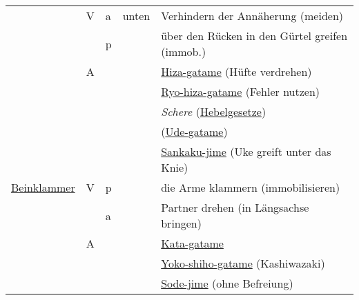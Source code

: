 \documentclass[justified, a4paper, notitlepage, captions=tableheading, nobib]{tufte-handout}
\begin{document}
\begin{center}
\begin{tabular}{lllll}
 & V & a & unten & Verhindern der Annäherung (meiden)\\
 &  & p &  & über den Rücken in den Gürtel greifen (immob.)\\
 & A &  &  & \hyperref[org937174c]{Hiza-gatame} (Hüfte verdrehen)\\
 &  &  &  & \hyperref[org5a19c66]{Ryo-hiza-gatame} (Fehler nutzen)\\
 &  &  &  & \emph{Schere} (\hyperref[org6c6f271]{Hebelgesetze})\\
 &  &  &  & (\hyperref[org7d0d631]{Ude-gatame})\\
 &  &  &  & \hyperref[orgb11245f]{Sankaku-jime} (Uke greift unter das Knie)\\
\hline
\hyperref[org8562ca1]{Beinklammer} & V & p &  & die Arme klammern (immobilisieren)\\
 &  & a &  & Partner drehen (in Längsachse bringen)\\
 & A &  &  & \hyperref[org977aeb7]{Kata-gatame}\\
 &  &  &  & \hyperref[orgb26bb0a]{Yoko-shiho-gatame} (Kashiwazaki)\\
 &  &  &  & \hyperref[org9269882]{Sode-jime} (ohne Befreiung)\\
\end{tabular}
\end{center}

\newpage
\end{document}

